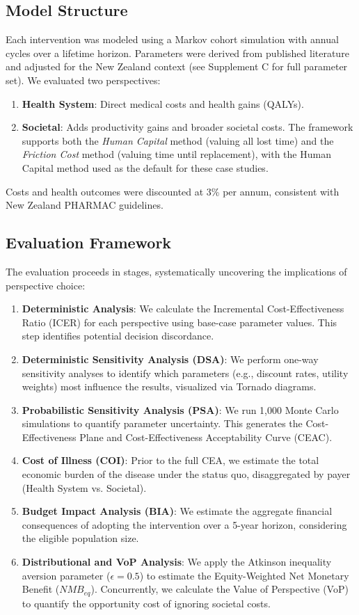 \documentclass{article}
\begin{document}
\subsection{Model Structure}
Each intervention was modeled using a Markov cohort simulation with annual cycles over a lifetime horizon.
Parameters were derived from published literature and adjusted for the New Zealand context (see Supplement C for full parameter set).
We evaluated two perspectives:
\begin{enumerate}
    \item \textbf{Health System}: Direct medical costs and health gains (QALYs).
    \item \textbf{Societal}: Adds productivity gains and broader societal costs. The framework supports both the \emph{Human Capital} method (valuing all lost time) and the \emph{Friction Cost} method (valuing time until replacement), with the Human Capital method used as the default for these case studies.
\end{enumerate}
Costs and health outcomes were discounted at 3\% per annum, consistent with New Zealand PHARMAC guidelines.

\subsection{Evaluation Framework}
The evaluation proceeds in stages, systematically uncovering the implications of perspective choice:
\begin{enumerate}
    \item \textbf{Deterministic Analysis}: We calculate the Incremental Cost-Effectiveness Ratio (ICER) for each perspective using base-case parameter values. This step identifies potential decision discordance.
    \item \textbf{Deterministic Sensitivity Analysis (DSA)}: We perform one-way sensitivity analyses to identify which parameters (e.g., discount rates, utility weights) most influence the results, visualized via Tornado diagrams.
    \item \textbf{Probabilistic Sensitivity Analysis (PSA)}: We run 1,000 Monte Carlo simulations to quantify parameter uncertainty. This generates the Cost-Effectiveness Plane and Cost-Effectiveness Acceptability Curve (CEAC).
    \item \textbf{Cost of Illness (COI)}: Prior to the full CEA, we estimate the total economic burden of the disease under the status quo, disaggregated by payer (Health System vs. Societal).
    \item \textbf{Budget Impact Analysis (BIA)}: We estimate the aggregate financial consequences of adopting the intervention over a 5-year horizon, considering the eligible population size.
    \item \textbf{Distributional and VoP Analysis}: We apply the Atkinson inequality aversion parameter ($\epsilon=0.5$) to estimate the Equity-Weighted Net Monetary Benefit ($NMB_{eq}$). Concurrently, we calculate the Value of Perspective (VoP) to quantify the opportunity cost of ignoring societal costs.
\end{enumerate}
\end{document}
